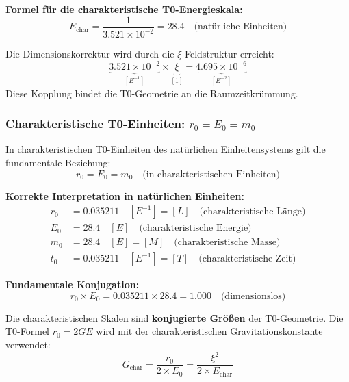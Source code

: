 \documentclass[12pt,a4paper]{report}
\begin{document}
	\textbf{Formel für die charakteristische T0-Energieskala:}
	\begin{equation}
		\boxed{E_{\text{char}} = \frac{1}{3.521 \times 10^{-2}} = 28.4 \quad \text{(natürliche Einheiten)}}
	\end{equation}
	
	Die Dimensionskorrektur wird durch die $\xi$-Feldstruktur erreicht:
	\begin{equation}
		\underbrace{3.521 \times 10^{-2}}_{[E^{-1}]} \times \underbrace{\xi}_{[1]} = \underbrace{4.695 \times 10^{-6}}_{[E^{-2}]}
	\end{equation}
	Diese Kopplung bindet die T0-Geometrie an die Raumzeitkrümmung.
	
	\subsubsection{Charakteristische T0-Einheiten: $r_0 = E_0 = m_0$}
	
	In charakteristischen T0-Einheiten des natürlichen Einheitensystems gilt die fundamentale Beziehung:
	\begin{equation}
		r_0 = E_0 = m_0 \quad \text{(in charakteristischen Einheiten)}
	\end{equation}
	
	\textbf{Korrekte Interpretation in natürlichen Einheiten:}
	\begin{align}
		r_0 &= 0.035211 \quad [E^{-1}] = [L] \quad \text{(charakteristische Länge)} \\
		E_0 &= 28.4 \quad [E] \quad \text{(charakteristische Energie)} \\
		m_0 &= 28.4 \quad [E] = [M] \quad \text{(charakteristische Masse)} \\
		t_0 &= 0.035211 \quad [E^{-1}] = [T] \quad \text{(charakteristische Zeit)}
	\end{align}
	
	\textbf{Fundamentale Konjugation:}
	\begin{equation}
		r_0 \times E_0 = 0.035211 \times 28.4 = 1.000 \quad \text{(dimensionslos)}
	\end{equation}
	
	Die charakteristischen Skalen sind \textbf{konjugierte Größen} der T0-Geometrie. Die T0-Formel $r_0 = 2GE$ wird mit der charakteristischen Gravitationskonstante verwendet:
	\begin{equation}
		G_{\text{char}} = \frac{r_0}{2 \times E_0} = \frac{\xi^2}{2 \times E_{\text{char}}}
	\end{equation}
	
\end{document}
